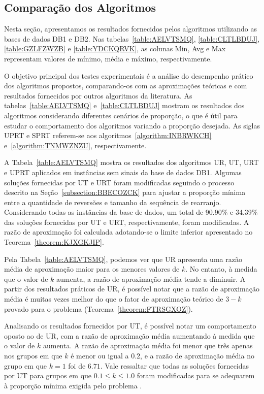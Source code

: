 \subsection{Comparação dos Algoritmos}

Nesta seção, apresentamos os resultados fornecidos pelos algoritmos utilizando as bases de dados DB1 e DB2. Nas tabelas~\ref{table:AELVTSMQ}, \ref{table:CLTLBDUJ}, \ref{table:GZLFZWZB} e \ref{table:YDCKQRVK}, as colunas Min, Avg e Max representam valores de mínimo, média e máximo, respectivamente.

O objetivo principal dos testes experimentais é a análise do desempenho prático dos algoritmos propostos, comparando-os com as aproximações teóricas e com resultados fornecidos por outros algoritmos da literatura. As tabelas~\ref{table:AELVTSMQ} e~\ref{table:CLTLBDUJ} mostram os resultados dos algoritmos considerando diferentes cenários de proporção, o que é útil para estudar o comportamento dos algoritmos variando a proporção desejada. As siglas UPRT e SPRT referem-se aos algoritmos~\ref{algorithm:INBRWKCH} e~\ref{algorithm:TNMWZNZU}, respectivamente.

A Tabela~\ref{table:AELVTSMQ} mostra os resultados dos algoritmos UR, UT, URT e UPRT aplicados em instâncias sem sinais da base de dados DB1. Algumas soluções fornecidas por UT e URT foram modificadas seguindo o processo descrito na Seção~\ref{subsection:BBECOZCK} para ajustar a proporção mínima entre a quantidade de reversões e tamanho da sequência de rearranjo. Considerando todas as instâncias da base de dados, um total de 90.90\% e 34.39\% das soluções fornecidas por UT e URT, respectivamente, foram modificadas. A razão de aproximação foi calculada adotando-se o limite inferior apresentado no Teorema~\ref{theorem:KJXGKJIP}.



Pela Tabela~\ref{table:AELVTSMQ}, podemos ver que UR apresenta uma razão média de aproximação maior para os menores valores de $k$. No entanto, à medida que o valor de $k$ aumenta, a razão de aproximação média tende a diminuir. A partir dos resultados práticos de UR, é possível notar que a razão de aproximação média é muitas vezes melhor do que o fator de aproximação teórico de $3-k$ provado para o problema (Teorema~\ref{theorem:FTRSGXOZ}).

Analisando os resultados fornecidos por UT, é possível notar um comportamento oposto ao de UR, com a razão de aproximação média aumentando à medida que o valor de $k$ aumenta. A razão de aproximação média foi menor que três apenas nos grupos em que $k$ é menor ou igual a $0.2$, e a razão de aproximação média no grupo em que $k = 1$ foi de $6.71$. Vale ressaltar que todas as soluções fornecidas por UT para grupos em que $0.1 \le k \le 1.0$ foram modificadas para se adequarem à proporção mínima exigida pelo problema \SbPRT.

